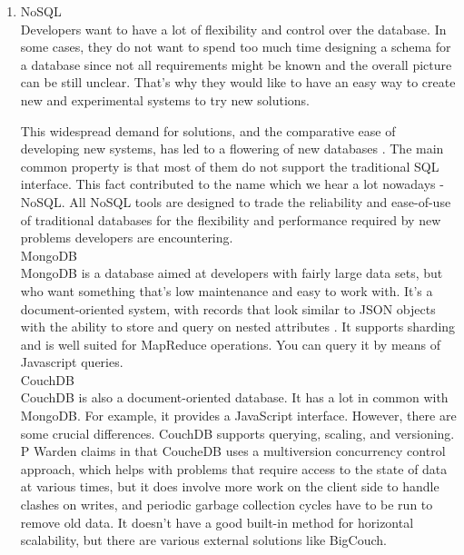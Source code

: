 \documentclass[runningheads]{llncs}
\begin{document}
\begin{enumerate}
\item NoSQL\\

Developers want to have a lot of flexibility and control over the database. In some cases, they do not want to spend too much time designing a schema for a database since not all requirements might be known and the overall picture can be still unclear. That's why they would like to have an easy way to create new and experimental systems to try new solutions.

This widespread demand for solutions, and the comparative ease of developing new systems, has led to a flowering of new databases \cite{GLOSSARY}. The main common property is that most of them do not support the traditional SQL interface. This fact contributed to the name which we hear a lot nowadays - NoSQL. All NoSQL tools are designed to trade the reliability and ease-of-use of traditional databases for the flexibility and performance required by new problems developers are encountering.\\

MongoDB\\

MongoDB is a database aimed at developers with fairly large data sets, but who want something that’s low maintenance and easy to work with. It’s a document-oriented system, with records that look similar to JSON objects with the ability to store and query on nested attributes \cite{GLOSSARY}. It supports sharding and is well suited for MapReduce operations. You can query it by means of Javascript queries.\\ 

CouchDB\\

CouchDB is also a document-oriented database. It has a lot in common with MongoDB. For example, it provides
a JavaScript interface. However, there are some crucial differences. CouchDB supports querying, scaling, and versioning. P Warden claims in \cite{GLOSSARY} that CoucheDB uses a multiversion concurrency control approach, which helps with problems that require access to the state of data at various times, but it does involve more work on the client side to handle clashes on writes, and periodic garbage collection cycles have to be run to remove old data. It doesn’t have a good built-in method for horizontal scalability, but there are various external solutions like BigCouch.\\


\end{enumerate}
\end{document}
